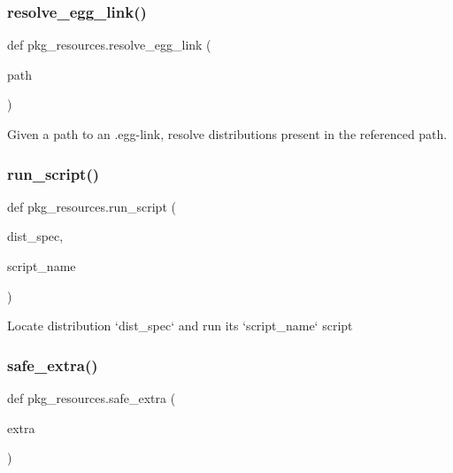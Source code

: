 \subsubsection{\texorpdfstring{resolve\+\_\+egg\+\_\+link()}{resolve\_egg\_link()}}
{\footnotesize\ttfamily def pkg\+\_\+resources.\+resolve\+\_\+egg\+\_\+link (\begin{DoxyParamCaption}\item[{}]{path }\end{DoxyParamCaption})}

\begin{DoxyVerb}Given a path to an .egg-link, resolve distributions
present in the referenced path.
\end{DoxyVerb}
 \mbox{\label{namespacepkg__resources_a37b3befc5c87a30dc05883907e765d4d}} 
\subsubsection{\texorpdfstring{run\+\_\+script()}{run\_script()}}
{\footnotesize\ttfamily def pkg\+\_\+resources.\+run\+\_\+script (\begin{DoxyParamCaption}\item[{}]{dist\+\_\+spec,  }\item[{}]{script\+\_\+name }\end{DoxyParamCaption})}

\begin{DoxyVerb}Locate distribution `dist_spec` and run its `script_name` script\end{DoxyVerb}
 \mbox{\label{namespacepkg__resources_a60b77b0c5890f9f0087fe9b6055f138f}} 
\subsubsection{\texorpdfstring{safe\+\_\+extra()}{safe\_extra()}}
{\footnotesize\ttfamily def pkg\+\_\+resources.\+safe\+\_\+extra (\begin{DoxyParamCaption}\item[{}]{extra }\end{DoxyParamCaption})}

